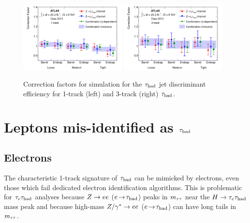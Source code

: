 \begin{figure}[tp]
  \centering
  \includegraphics[width=0.48\textwidth]{figures/PERF-2013-06/fig_11a}
  \includegraphics[width=0.48\textwidth]{figures/PERF-2013-06/fig_11b}
  \caption{Correction factors for simulation for the $\tau_\text{had}$ jet discriminant efficiency for 1-track (left) and 3-track (right) $\tau_\text{had}$.}
  \label{fig:taus-scalefactors}
\end{figure}

\section{Leptons mis-identified as $\tau_\text{had}$}
\label{sec:taus-leptonfakes}

\subsection{Electrons}

The characteristic 1-track signature of $\tau_\text{had}$ can be mimicked by electrons, even those which fail dedicated electron identification algorithms. This is problematic for $\tau_e \tau_\text{had}$ analyses because $Z \rightarrow ee$ ($e \!\rightarrow\!\tau_\text{had}$) peaks in $m_{\tau\tau}$ near the $H\rightarrow\tau_e \tau_\text{had}$ mass peak and because high-mass $Z/\gamma^\ast \rightarrow ee$ ($e \!\rightarrow\!\tau_\text{had}$) can have long tails in $m_{\tau\tau}$.

